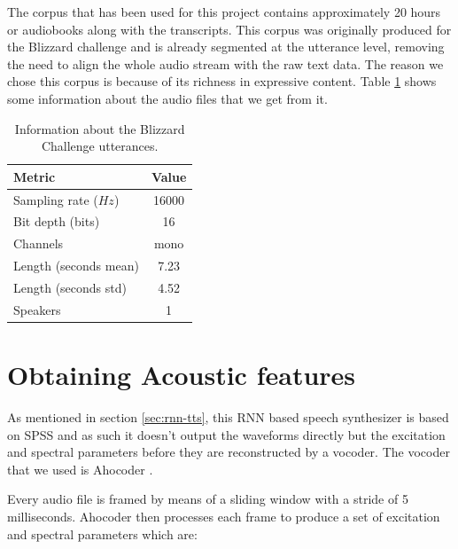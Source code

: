 The corpus that has been used for this project contains approximately 20 hours or audiobooks along with the transcripts. This corpus was originally produced for the Blizzard challenge \cite{blizzard} and is already segmented at the utterance level, removing the need to align the whole audio stream with the raw text data. The reason we chose this corpus is because of its richness in expressive content. Table \ref{tab:blizard} shows some information about the audio files that we get from it.

\begin{table}[h]
    \centering
    \begin{tabular}{l|c}
        Metric & Value \\
        \hline
        Sampling rate ($Hz$) & 16000 \\
        Bit depth (bits) & 16 \\
        Channels & mono \\
        Length (seconds mean) & 7.23 \\
        Length (seconds std) & 4.52 \\
        Speakers & 1
    \end{tabular}
    \caption{Information about the Blizzard Challenge utterances.}
    \label{tab:blizard}
\end{table}


\section{Obtaining Acoustic features} \label{sec:aco-features}

As mentioned in section \ref{sec:rnn-tts}, this RNN based speech synthesizer is based on SPSS and as such it doesn't output the waveforms directly but the excitation and spectral parameters before they are reconstructed by a vocoder. The vocoder that we used is Ahocoder \cite{vocoder_ah}.

Every audio file is framed by means of a sliding window with a stride of 5 milliseconds. Ahocoder then processes each frame to produce a set of excitation and spectral parameters which are:

